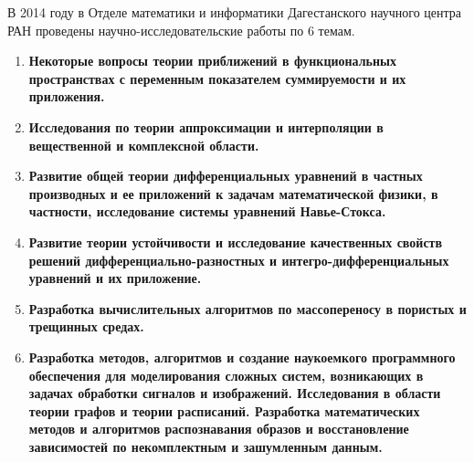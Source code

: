 \Conclusion

В 2014 году в Отделе математики и информатики Дагестанского научного центра РАН проведены научно-исследовательские работы по 6 темам.


\begin{enumerate}[1.]
\item
\textbf{Некоторые вопросы теории приближений в функциональных пространствах с переменным показателем суммируемости и их приложения.}




\item
\textbf{Исследования по теории аппроксимации и интерполяции в вещественной и комплексной области.}




\item
\textbf{Развитие общей теории дифференциальных уравнений в частных производных и ее приложений к задачам математической физики, в частности, исследование системы уравнений Навье-Стокса.}




\item
\textbf{Развитие теории устойчивости и исследование качественных свойств решений дифференциально-разностных и интегро-дифференциальных уравнений и их приложение.}




\item
\textbf{Разработка вычислительных алгоритмов по массопереносу в пористых и трещинных средах.}





\item
\textbf{Разработка методов, алгоритмов и создание наукоемкого программного обеспечения для моделирования сложных систем, возникающих в задачах обработки сигналов и изображений. Исследования в области теории графов и теории расписаний.
Разработка математических методов и алгоритмов распознавания образов и восстановление зависимостей по некомплектным и зашумленным данным.}




\end{enumerate}




